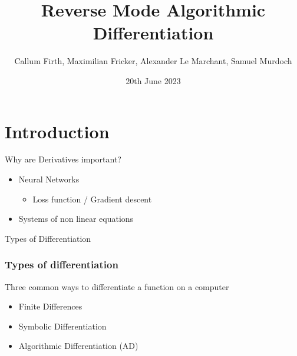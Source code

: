 \documentclass{beamer}
\title{Reverse Mode Algorithmic Differentiation}
\author[Group 18]{Callum Firth, Maximilian Fricker, Alexander Le Marchant, Samuel Murdoch}
\institute[Imperial]{Imperial College London}
\date{20th June 2023}
\begin{document}
\frame{\titlepage}



% 





\section{Introduction}

\begin{frame}{Why are Derivatives important?}
\begin{itemize}
    \item Neural Networks
    \begin{itemize}
        \item Loss function / Gradient descent
    \end{itemize}
    \item Systems of non linear equations
\end{itemize}
\end{frame}

\begin{frame}{Types of Differentiation}
\frametitle{Types of differentiation}
Three common ways to differentiate a function on a computer
\begin{itemize}
    \item Finite Differences
    \item Symbolic Differentiation
    \item Algorithmic Differentiation (AD)
\end{itemize}
\end{frame}
\end{document}
